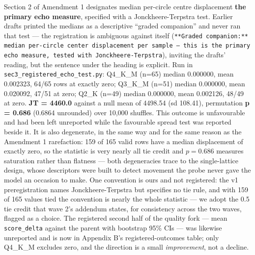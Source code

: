 Section 2 of Amendment 1 designates median per-circle centre displacement \textbf{the primary echo measure}, specified with a Jonckheere-Terpstra test. Earlier drafts printed the medians as a descriptive ``graded companion'' and never ran that test --- the registration is ambiguous against itself (\texttt{**Graded companion:** median per-circle center displacement per sample --- this is the primary echo measure, tested with Jonckheere-Terpstra}), inviting the drafts' reading, but the sentence under the heading is explicit. Run in \texttt{sec3\_registered\_echo\_test.py}: Q4\_K\_M (n=65) median 0.000000, mean 0.002323, 64/65 rows at exactly zero; Q3\_K\_M (n=51) median 0.000000, mean 0.020092, 47/51 at zero; Q2\_K (n=49) median 0.000000, mean 0.002126, 48/49 at zero. \textbf{JT = 4460.0} against a null mean of 4498.54 (sd 108.41), permutation \textbf{p = 0.686} (0.6864 unrounded) over 10,000 shuffles. This outcome is unfavourable and had been left unreported while the favourable spread test was reported beside it. It is also degenerate, in the same way and for the same reason as the Amendment 1 rarefaction: 159 of 165 valid rows have a median displacement of exactly zero, so the statistic is very nearly all tie credit and $p = 0.686$ measures saturation rather than flatness --- both degeneracies trace to the single-lattice design, whose descriptors were built to detect movement the probe never gave the model an occasion to make. One convention is ours and not registered: the v1 preregistration names Jonckheere-Terpstra but specifies no tie rule, and with 159 of 165 values tied the convention is nearly the whole statistic --- we adopt the 0.5 tie credit that wave 2's addendum states, for consistency across the two waves, flagged as a choice. The registered second half of the quality fork --- mean \texttt{score\_delta} against the parent with bootstrap 95\% CIs --- was likewise unreported and is now in Appendix B's registered-outcomes table; only Q4\_K\_M excludes zero, and the direction is a small \emph{improvement}, not a decline.

